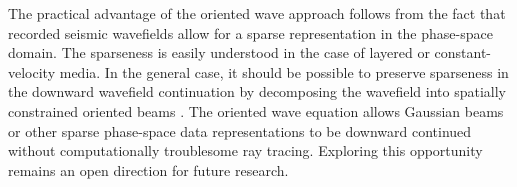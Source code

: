 The practical advantage of the oriented wave approach follows from the fact
that recorded seismic wavefields allow for a sparse representation in the
phase-space domain. The sparseness is easily understood in the case of layered
or constant-velocity media. In the general case, it should be possible to
preserve sparseness in the downward wavefield continuation by decomposing the
wavefield into spatially constrained oriented beams \cite[]{wg}. The oriented
wave equation allows Gaussian beams \cite[]{GEO66-04-12401250} or other sparse
phase-space data representations to be downward continued without
computationally troublesome ray tracing. Exploring this opportunity remains an
open direction for future research.

 




